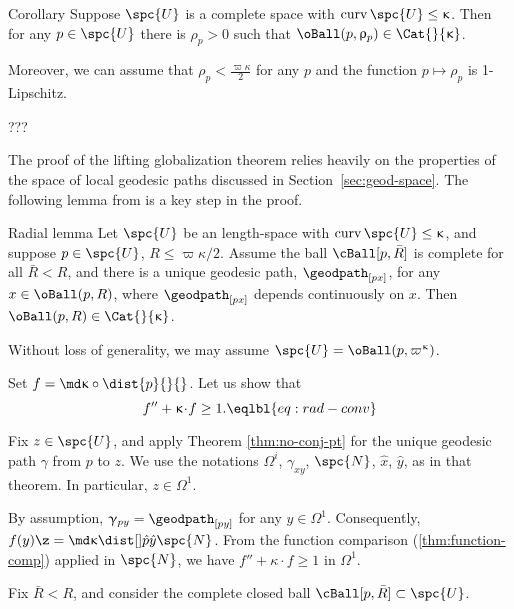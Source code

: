 \begin{thm}{Corollary}\label{cor:loc-CAT(k)}
Suppose $\spc{U}$ is a complete space 
with $\curv\spc{U}\le\kappa$.
Then for any $p\in\spc{U}$ there is $\rho_p>0$
such that $\oBall(p,\rho_p)\in\Cat{}{\kappa}$.

Moreover, we can assume that $\rho_p<\tfrac{\varpi\kappa}2$
for any $p$ and the function $p\mapsto\rho_p$ is 1-Lipschitz.
\end{thm}

 ???\qeds




The proof of the lifting globalization theorem relies heavily on the properties of the space of local geodesic paths discussed in Section~\ref{sec:geod-space}.
The following lemma from \cite{a-b:cbc} 
is a key step in the proof.

\begin{thm}{Radial lemma}\label{lem:radial-glob}
Let $\spc{U}$ be an length-space 
with $\curv\spc{U}\le\kappa$,
and suppose $p\in\spc{U}$, $R\le\varpi\kappa/2$.  Assume the ball  $\cBall[p,\bar{R}]$ is complete
for all $\bar{R}<R$, and  there is a unique geodesic path, $\geodpath_{[p x]}$,  for any $x\in\oBall(p,R)$, 
where  $\geodpath_{[p x]}$ depends continuously on $x$.
Then $\oBall(p,R) \in\Cat{}{\kappa}$.
\end{thm}
 
Without loss of generality, we may assume  $\spc{U}=\oBall(p,\varpi\kappa)$.

Set $f=\md\kappa\circ\dist{p}{}{}$.  Let us show that
\[f''+\kappa\cdot f\ge 1.
\eqlbl{eq:rad-conv}\]



Fix $z\in \spc{U}$, and apply Theorem \ref{thm:no-conj-pt} for the unique geodesic path $\gamma$
from $p$ to $z$.  We use the  notations $\Omega^i$, 
$\gamma_{x y}$, $\spc{N}$, $\hat{x}$, $\hat{y}$,  as in that theorem.
In particular, $z\in\Omega^1$.

By assumption,
$\gamma_{p y}=\geodpath_{[p y]}$ for any $y\in\Omega^1$. Consequently,
 $f(y)\z=\md\kappa\dist[{{}}]{\hat{p}}{\hat{y}}{\spc{N}}$.
From the function comparison (\ref{thm:function-comp}) applied in $\spc{N}$,
we have $f''+\kappa\cdot f\ge 1$ in $\Omega^1$.

Fix $\bar R<R$, and consider  the complete closed ball $\cBall[ p,\bar R]\subset\spc{U}$.

